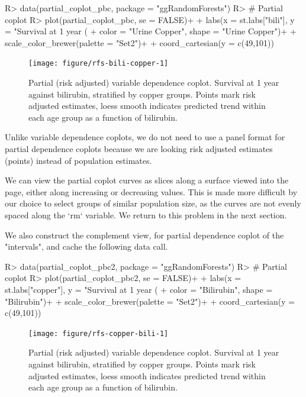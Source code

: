 \documentclass[nojss]{jss}\usepackage[]{graphicx}\usepackage[]{color}
\begin{document}
\begin{Schunk}
\begin{Sinput}
R> data(partial_coplot_pbc, package = "ggRandomForests")
R> # Partial coplot
R> plot(partial_coplot_pbc, se = FALSE)+
+   labs(x = st.labs["bili"], y = "Survival at 1 year (%
+        color = "Urine Copper", shape = "Urine Copper")+
+   scale_color_brewer(palette = "Set2")+
+   coord_cartesian(y = c(49,101))
\end{Sinput}
\begin{figure}[!htpb]

{\centering \texttt{[image: figure/rfs-bili-copper-1]} 

}

\caption[Partial (risk adjusted) variable dependence coplot]{Partial (risk adjusted) variable dependence coplot. Survival at 1 year against bilirubin, stratified by copper groups. Points mark risk adjusted estimates, loess smooth indicates predicted trend within each age group as a function of bilirubin.\label{fig:bili-copper}}
\end{figure}
\end{Schunk}

Unlike variable dependence coplots, we do not need to use a panel format for partial dependence coplots because we are looking risk adjusted estimates (points) instead of population estimates. 


We can view the partial coplot curves as slices along a surface viewed into the page, either along increasing or decreasing values. This is made more difficult by our choice to select groups of similar population size, as the curves are not evenly spaced along the `rm` variable. We return to this problem in the next section. 

We also construct the complement view, for partial dependence coplot of the  "intervals", and cache the following  data call.



\begin{Schunk}
\begin{Sinput}
R> data(partial_coplot_pbc2, package = "ggRandomForests")
R> # Partial coplot
R> plot(partial_coplot_pbc2, se = FALSE)+
+   labs(x = st.labs["copper"], y = "Survival at 1 year (%
+        color = "Bilirubin", shape = "Bilirubin")+
+   scale_color_brewer(palette = "Set2")+
+   coord_cartesian(y = c(49,101))
\end{Sinput}
\begin{figure}[!htpb]

{\centering \texttt{[image: figure/rfs-copper-bili-1]} 

}

\caption[Partial (risk adjusted) variable dependence coplot]{Partial (risk adjusted) variable dependence coplot. Survival at 1 year against bilirubin, stratified by copper groups. Points mark risk adjusted estimates, loess smooth indicates predicted trend within each age group as a function of bilirubin.\label{fig:copper-bili}}
\end{figure}
\end{Schunk}
\end{document}
